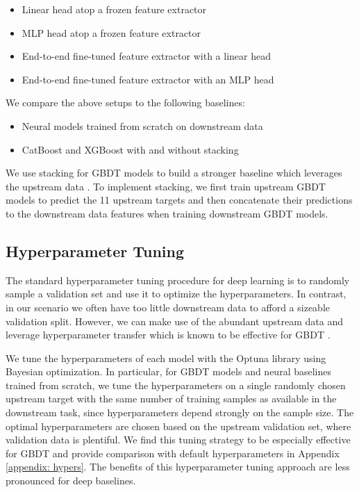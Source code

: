 \begin{itemize}
    \item Linear head atop a frozen feature extractor \item MLP head atop a frozen feature extractor \item End-to-end fine-tuned feature extractor with a linear head \item End-to-end fine-tuned feature extractor with an MLP head
\end{itemize}

We compare the above setups to the following baselines:

\begin{itemize}
    \item Neural models trained from scratch on downstream data \item CatBoost and XGBoost with and without stacking
\end{itemize}

We use stacking for GBDT models to build a stronger baseline which leverages the upstream data \citep{wolpert1992stacked, ting1997stacked}. To implement stacking, we first train upstream GBDT models to predict the 11 upstream targets and then concatenate their predictions to the downstream data features when training downstream GBDT models.

\subsection{Hyperparameter Tuning} The standard hyperparameter tuning procedure for deep learning is to randomly sample a validation set and use it to optimize the hyperparameters. In contrast, in our scenario we often have too little downstream data to afford a sizeable validation split. However, we can make use of the abundant upstream data and leverage hyperparameter transfer which is known to be effective for GBDT \citep{woznica2022consolidated, metaMIMIC_github}. 

We tune the hyperparameters of each model with the Optuna library \citep{akiba2019optuna} using Bayesian optimization. In particular, for GBDT models and neural baselines trained from scratch, we tune the hyperparameters on a single randomly chosen upstream target with the same number of training samples as available in the downstream task, since hyperparameters depend strongly on the sample size. The optimal hyperparameters are chosen based on the upstream validation set, where validation data is plentiful. We find this tuning strategy to be especially effective for GBDT and provide comparison with default hyperparameters in Appendix \ref{appendix: hypers}. The benefits of this hyperparameter tuning approach are less pronounced for deep baselines.


